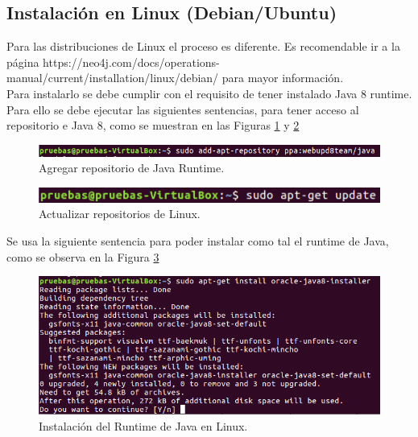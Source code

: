 \documentclass[conference]{IEEEtran}
\begin{document}
\subsection{Instalación en Linux (Debian/Ubuntu)}

Para las distribuciones de Linux el proceso es diferente. Es recomendable ir a la página https://neo4j.com/docs/operations-manual/current/installation/linux/debian/ para mayor información. \\
Para instalarlo se debe cumplir con el requisito de tener instalado Java 8 runtime. Para ello se debe ejecutar las siguientes sentencias, para tener acceso al repositorio e Java 8, como se muestran en las Figuras \ref{fig7} y \ref{fig8} 


\begin{figure}[H]
\begin{center}
\includegraphics[width= 0.45 \textwidth]{java_repo.png}
\end{center}
\caption{Agregar repositorio de Java Runtime.}
\label{fig7}
\end{figure}

\begin{figure}[H]
\begin{center}
\includegraphics[width= 0.45 \textwidth]{sudo_update.png}
\end{center}
\caption{Actualizar repositorios de Linux.}
\label{fig8}
\end{figure}

Se usa la siguiente sentencia para poder instalar como tal el runtime de Java, como se observa en la Figura \ref{fig9}

\begin{figure}[H]
\begin{center}
\includegraphics[width= 0.45 \textwidth]{install_java.png}
\end{center}
\caption{Instalación del Runtime de Java en Linux.}
\label{fig9}
\end{figure}

\end{document}
